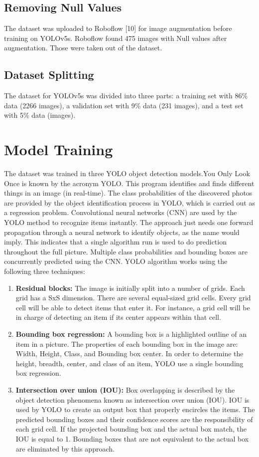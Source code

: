 \subsection{Removing Null Values} The dataset was uploaded to Roboflow [10] for image augmentation before training on YOLOv5s. Roboflow found 475 images with Null values after augmentation. Those were taken out of the dataset.
\subsection{Dataset Splitting} The dataset for YOLOv5s was divided into three parts: a training set with 86\% data (2266 images), a validation set with 9\% data (231 images), and a test set with 5\% data (images).

\section{Model Training} The dataset was trained in three YOLO object detection models.You Only Look Once is known by the acronym YOLO. This program identifies and finds different things in an image (in real-time). The class probabilities of the discovered photos are provided by the object identification process in YOLO, which is carried out as a regression problem. Convolutional neural networks (CNN) are used by the YOLO method to recognize items instantly. The approach just needs one forward propagation through a neural network to identify objects, as the name would imply. This indicates that a single algorithm run is used to do prediction throughout the full picture. Multiple class probabilities and bounding boxes are concurrently predicted using the CNN. YOLO algorithm works using the following three techniques:
\begin{enumerate}
    \item \textbf{Residual blocks: }The image is initially split into a number of grids. Each grid has a SxS dimension. There are several equal-sized grid cells. Every grid cell will be able to detect items that enter it. For instance, a grid cell will be in charge of detecting an item if its center appears within that cell.
    \item \textbf{Bounding box regression: }A bounding box is a highlighted outline of an item in a picture. The properties of each bounding box in the image are: Width, Height, Class, and Bounding box center. In order to determine the height, breadth, center, and class of an item, YOLO use a single bounding box regression.
    \item \textbf{Intersection over union (IOU): }Box overlapping is described by the object detection phenomena known as intersection over union (IOU). IOU is used by YOLO to create an output box that properly encircles the items. The predicted bounding boxes and their confidence scores are the responsibility of each grid cell. If the projected bounding box and the actual box match, the IOU is equal to 1. Bounding boxes that are not equivalent to the actual box are eliminated by this approach.
\end{enumerate}
